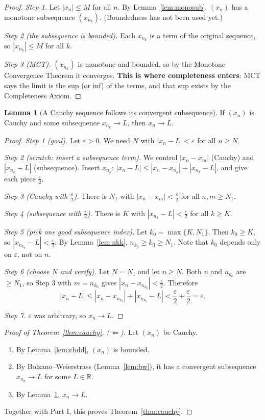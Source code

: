 \documentclass[11pt]{article}
\theoremstyle{definition}
\newtheorem{lem}[defn]{Lemma}
\newcommand{\R}{\mathbb{R}}
\newcommand{\eps}{\varepsilon}
\newcommand{\key}[1]{\textcolor{red!70!black}{\textbf{#1}}}
\begin{document}
\begin{proof}
\emph{Step 1.} Let $|x_n|\le M$ for all $n$. By
Lemma~\ref{lem:monosub}, $(x_n)$ has a monotone subsequence $(x_{n_k})$.
(Boundedness has not been used yet.)

\emph{Step 2 (the subsequence is bounded).} Each $x_{n_k}$ is a term of
the original sequence, so $|x_{n_k}|\le M$ for all $k$.

\emph{Step 3 (MCT).} $(x_{n_k})$ is monotone and bounded, so by the
Monotone Convergence Theorem it converges. \key{This is where
completeness enters}: MCT says the limit is the sup (or inf) of the
terms, and that sup exists by the Completeness Axiom.
\end{proof}

\begin{lem}[A Cauchy sequence follows its convergent subsequence]\label{lem:csub}
If $(x_n)$ is Cauchy and some subsequence $x_{n_k}\to L$, then
$x_n\to L$.
\end{lem}

\begin{proof}
\emph{Step 1 (goal).} Let $\eps>0$. We need $N$ with $|x_n-L|<\eps$ for
all $n\ge N$.

\emph{Step 2 (scratch: insert a subsequence term).} We control
$|x_n-x_m|$ (Cauchy) and $|x_{n_k}-L|$ (subsequence). Insert $x_{n_k}$:
$|x_n-L|\le|x_n-x_{n_k}|+|x_{n_k}-L|$, and give each piece
$\frac\eps2$.

\emph{Step 3 (Cauchy with $\frac\eps2$).} There is $N_1$ with
$|x_n-x_m|<\frac\eps2$ for all $n,m\ge N_1$.

\emph{Step 4 (subsequence with $\frac\eps2$).} There is $K$ with
$|x_{n_k}-L|<\frac\eps2$ for all $k\ge K$.

\emph{Step 5 (pick one good subsequence index).} Let
$k_0=\max\{K,N_1\}$. Then $k_0\ge K$, so $|x_{n_{k_0}}-L|<\frac\eps2$.
By Lemma~\ref{lem:nkk}, $n_{k_0}\ge k_0\ge N_1$. Note that $k_0$ depends
only on $\eps$, not on $n$.

\emph{Step 6 (choose $N$ and verify).} Let $N=N_1$ and let $n\ge N$.
Both $n$ and $n_{k_0}$ are $\ge N_1$, so Step 3 with $m=n_{k_0}$ gives
$|x_n-x_{n_{k_0}}|<\frac\eps2$. Therefore
\[
|x_n-L|\le|x_n-x_{n_{k_0}}|+|x_{n_{k_0}}-L|<\frac\eps2+\frac\eps2=\eps.
\]

\emph{Step 7.} $\eps$ was arbitrary, so $x_n\to L$.
\end{proof}

\begin{proof}[Proof of Theorem~\ref{thm:cauchy}, ($\Leftarrow$)]
Let $(x_n)$ be Cauchy.
\begin{enumerate}[nosep]
  \item By Lemma~\ref{lem:cbdd}, $(x_n)$ is bounded.
  \item By Bolzano--Weierstrass (Lemma~\ref{lem:bw}), it has a convergent
        subsequence $x_{n_k}\to L$ for some $L\in\R$.
  \item By Lemma~\ref{lem:csub}, $x_n\to L$.
\end{enumerate}
Together with Part I, this proves Theorem~\ref{thm:cauchy}.
\end{proof}
\end{document}

